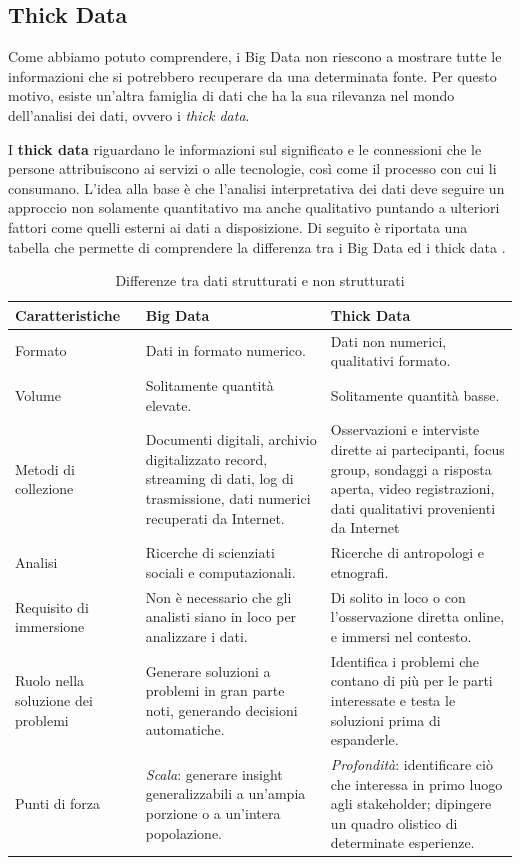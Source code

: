 \subsection{Thick Data}

Come abbiamo potuto comprendere, i Big Data non riescono a mostrare tutte le informazioni che si potrebbero recuperare da una determinata fonte. Per questo motivo, esiste un'altra famiglia di dati che ha la sua rilevanza nel mondo dell'analisi dei dati, ovvero i \textit{thick data}.

I \textbf{thick data} riguardano le informazioni sul significato e le connessioni che le persone attribuiscono ai servizi o alle tecnologie, così come il processo con cui li consumano. L'idea alla base è che l'analisi interpretativa dei dati deve seguire un approccio non solamente quantitativo ma anche qualitativo puntando a ulteriori fattori come quelli esterni ai dati a disposizione. Di seguito è riportata una tabella che permette di comprendere la differenza tra i Big Data ed i thick data \cite{big_data_and_thick_data}.

\begin{longtable}{|p{4cm}|p{5cm}|p{5cm}|}
    \caption{Differenze tra dati strutturati e non strutturati} \\
    \hline
    \textbf{Caratteristiche} & \textbf{Big Data} & \textbf{Thick Data} \\
    \hline
    \endfirsthead 
    
    Formato & Dati in formato numerico. & Dati non numerici, qualitativi formato. \\ 
    \hline
    Volume & Solitamente quantità elevate. & Solitamente quantità basse. \\ 
    \hline
    Metodi di collezione & Documenti digitali, archivio digitalizzato record, streaming di dati, log di trasmissione, dati numerici recuperati da Internet. & Osservazioni e interviste dirette ai partecipanti, focus group, sondaggi a risposta aperta, video registrazioni, dati qualitativi provenienti da Internet \\ 
    \hline
    Analisi & Ricerche di scienziati sociali e computazionali. & Ricerche di antropologi e etnografi. \\ 
    \hline
    Requisito di immersione & Non è necessario che gli analisti siano in loco per analizzare i dati. & Di solito in loco o con l'osservazione diretta online, e immersi nel contesto. \\ 
    \hline
    Ruolo nella soluzione dei problemi & Generare soluzioni a problemi in gran parte noti, generando decisioni automatiche. & Identifica i problemi che contano di più per le parti interessate e testa le soluzioni prima di espanderle. \\ 
    \hline
    Punti di forza & \textit{Scala}: generare insight generalizzabili a un'ampia porzione o a un'intera popolazione. & \textit{Profondità}: identificare ciò che interessa in primo luogo agli stakeholder; dipingere un quadro olistico di determinate esperienze. \\ 
    \hline
\end{longtable}


